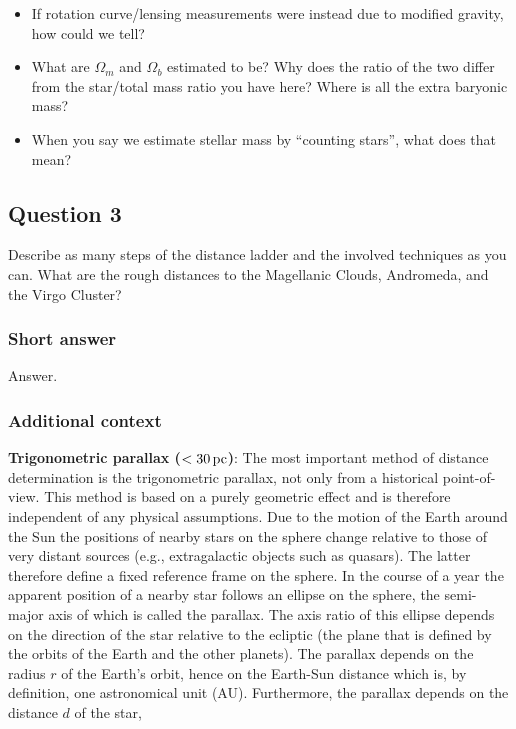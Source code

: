 \documentclass[a4paper,11pt]{article}
\begin{document}
\begin{itemize}
    \item If rotation curve/lensing measurements were instead due to modified gravity, how could we tell?
    \item What are $\Omega_m$ and $\Omega_b$ estimated to be? Why does the ratio of the two differ from the star/total mass ratio you have here? Where is all the extra baryonic mass?
    \item When you say we estimate stellar mass by ``counting stars'', what does that mean?
\end{itemize}


\newpage
\subsection{Question 3}

Describe as many steps of the distance ladder and the involved techniques as you can. What are the rough distances to the Magellanic Clouds, Andromeda, and the Virgo Cluster?

\subsubsection{Short answer}

Answer.

\subsubsection{Additional context}

{\noindent}\textbf{Trigonometric parallax ($<30\,{\rm pc}$)}: The most important method of distance determination is the trigonometric parallax, not only from a historical point-of-view. This method is based on a purely geometric effect and is therefore independent of any physical assumptions. Due to the motion of the Earth around the Sun the positions of nearby stars on the sphere change relative to those of very distant sources (e.g., extragalactic objects such as quasars). The latter therefore define a fixed reference frame on the sphere. In the course of a year the apparent position of a nearby star follows an ellipse on the sphere, the semi-major axis of which is called the parallax. The axis ratio of this ellipse depends on the direction of the star relative to the ecliptic (the plane that is defined by the orbits of the Earth and the other planets). The parallax depends on the radius $r$ of the Earth’s orbit, hence on the Earth-Sun distance which is, by definition, one astronomical unit (AU). Furthermore, the parallax depends on the distance $d$ of the star,
\end{document}
